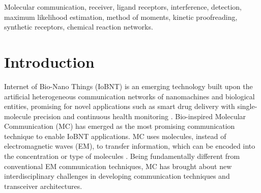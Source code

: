 \documentclass[twocolumn]{IEEEtran}
\begin{document}
\begin{IEEEkeywords}
Molecular communication, receiver, ligand receptors, interference, detection, maximum likelihood estimation, method of moments,  kinetic proofreading, synthetic receptors, chemical reaction networks.
\end{IEEEkeywords}

\IEEEpeerreviewmaketitle

\section{Introduction}
\label{sec:Introduction}
Internet of Bio-Nano Things (IoBNT) is an emerging technology built upon the artificial heterogeneous communication networks of nanomachines and biological entities, promising for novel applications such as smart drug delivery with single-molecule precision and continuous health monitoring \cite{akyildiz2015internet, kuscu2016internet, dinc2019internet, akyildiz2019microbiome}. Bio-inspired Molecular Communication (MC) has emerged as the most promising communication technique to enable IoBNT applications. MC uses molecules, instead of electromagnetic waves (EM), to transfer information, which can be encoded into the concentration or type of molecules \cite{atakan2016molecular, akan2017fundamentals, akyildiz2019moving}. Being fundamentally different from conventional EM communication techniques, MC has brought about new interdisciplinary challenges in developing communication techniques and transceiver architectures.





\end{document}
